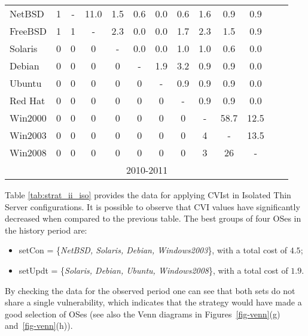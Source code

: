 \begin{table}[!ht]
\begin{center}
{\begin{tabular}{|l|c|c|c|c|c|c|c|c|c|c|c|c|}
NetBSD & 1 & - & 11.0 & 1.5 & 0.6 & 0.0 & 0.6 & 1.6 & 0.9 & 0.9&\\ \cline{1-11}
FreeBSD & 1 & 1 & - & 2.3 & 0.0 & 0.0 & 1.7 & 2.3 & 1.5 & 0.9&\\ \cline{1-11}
Solaris & 0 & 0 & 0 & - & 0.0 & 0.0 & 1.0 & 1.0 & 0.6 & 0.0&\\ \cline{1-11}
Debian & 0 & 0 & 0 & 0 & - & 1.9 & 3.2 & 0.9 & 0.9 & 0.0&\\ \cline{1-11}
Ubuntu & 0 & 0 & 0 & 0 & 0 &  - & 0.9 & 0.9 & 0.9 & 0.0&\\ \cline{1-11}
Red Hat & 0 & 0 & 0 & 0 & 0 & 0 &- & 0.9 & 0.9 & 0.0&\\ \cline{1-11}
Win2000 & 0 & 0 & 0 & 0 & 0 & 0 & 0 & - & 58.7 & 12.5&\\ \cline{1-11}
Win2003 & 0 & 0 & 0 & 0 & 0 & 0 & 0 & 4 & - & 13.5&\\ \cline{1-12}
Win2008 & 0 & 0 & 0 & 0 & 0 & 0 & 0 & 3 & 26 & -&\multicolumn{1}{|c}{}  \\ \cline{1-11}
 \multicolumn{1}{c|}{}& \multicolumn{9}{|c|}{2010-2011} & \multicolumn{2}{|c}{}\\ \cline{2-10}
\end{tabular}
}
\end{center}
\end{table}




Table \ref{tab:strat_ii_iso} provides the data for applying CVIst in Isolated Thin Server configurations. It is possible to observe that CVI values have significantly decreased when compared to the previous table. The best groups of four OSes in the history period are:
 
\begin{itemize}
\item setCon = \{\emph{NetBSD, Solaris, Debian, Windows2003}\}, with a total cost of $4.5$;
\item setUpdt = \{\emph{Solaris, Debian, Ubuntu, Windows2008}\}, with a total cost of $1.9$.
\end{itemize}

By checking the data for the observed period one can see that both sets do not share a single vulnerability, which indicates that the strategy would have made a good selection of OSes (see also the Venn diagrams in Figures~\ref{fig-venn}(g) and~\ref{fig-venn}(h)).


